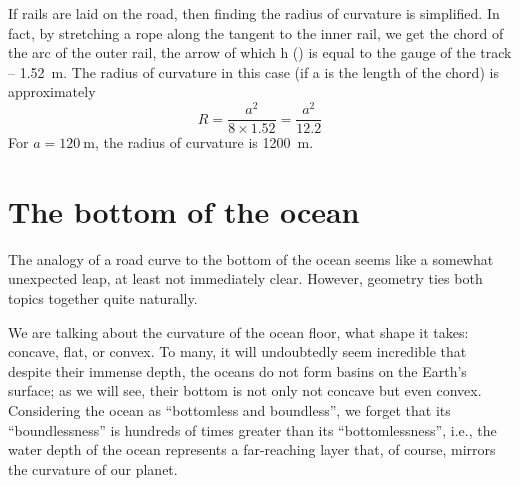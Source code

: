 If rails are laid on the road, then finding the radius of curvature is simplified. In fact, by stretching a rope along the tangent to the inner rail, we get the chord of the arc of the outer rail, the arrow of which h () is equal to the gauge of the track -- \SI{1.52}{\meter}. The radius of curvature in this case (if a is the length of the chord) is approximately
\begin{equation*}%
R = \frac{a^{2}}{8 \times 1.52} = \frac{a^{2}}{12.2}
\end{equation*}
For $a = \SI{120}{\meter}$, the radius of curvature is \SI{1200}{\meter}.




\section{The bottom of the ocean}
\label{sec-4.8}

The analogy of a road curve to the bottom of the ocean seems like a somewhat unexpected leap, at least not immediately clear. However, geometry ties both topics together quite naturally.

We are talking about the curvature of the ocean floor, what shape it takes: concave, flat, or convex. To many, it will undoubtedly seem incredible that despite their immense depth, the oceans do not form basins on the Earth's surface; as we will see, their bottom is not only not concave but even convex. Considering the ocean as ``bottomless and boundless'', we forget that its ``boundlessness'' is hundreds of times greater than its ``bottomlessness'', i.e., the water depth of the ocean represents a far-reaching layer that, of course, mirrors the curvature of our planet.

